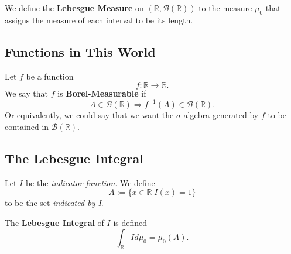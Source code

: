 \documentclass[a4paper,12pt]{scrartcl}
\begin{document}
We define the \textbf{Lebesgue Measure} on $(\mathbb{R}, \mathcal{B}(\mathbb{R}))$ to the measure $\mu_0$ that assigns the measure of 
each interval to be its length.  

\subsection{Functions in This World}

Let $f$ be a function 
\[ f: \mathbb{R} \rightarrow \mathbb{R}. \]
We say that $f$ is \textbf{Borel-Measurable} if
\[ A \in \mathcal{B}(\mathbb{R}) \Rightarrow f^{-1}(A) \in \mathcal{B}(\mathbb{R}). \]
Or equivalently, we could say that we want the $\sigma$-algebra generated by $f$ to be contained in $\mathcal{B}(\mathbb{R})$.

\subsection{The Lebesgue Integral}

Let $I$ be the \emph{indicator function}.  We define 
\[ A := \{ x \in \mathbb{R}| I(x) =1 \} \]
to be the set \emph{indicated by I}.

The \textbf{Lebesgue Integral} of $I$ is defined
\[ \int_{\mathbb{R}} I d\mu_0 = \mu_0(A). \]
\end{document}
